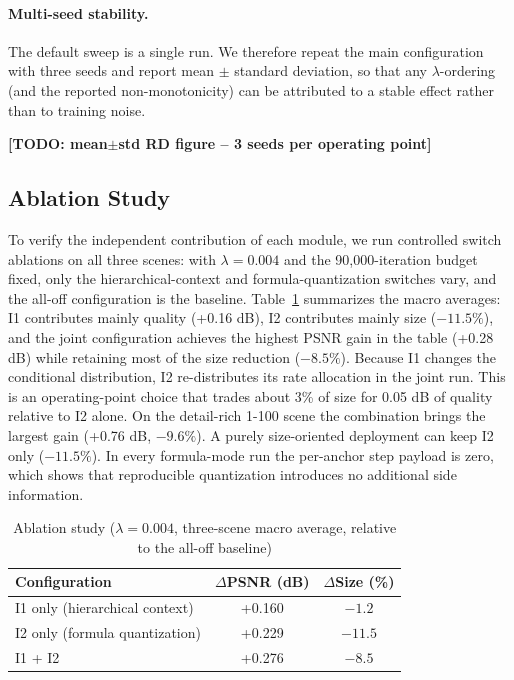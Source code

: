 \documentclass[conference]{IEEEtran}
\begin{document}
\paragraph{Multi-seed stability.}
The default sweep is a single run. We therefore repeat the main
configuration with three seeds and report mean $\pm$ standard deviation,
so that any $\lambda$-ordering (and the reported non-monotonicity) can be
attributed to a stable effect rather than to training noise.
\begin{center}\textbf{[TODO: mean$\pm$std RD figure -- 3 seeds per operating point]}
\end{center}

\subsection{Ablation Study}
\label{sec:ablation}
To verify the independent contribution of each module, we run controlled
switch ablations on all three scenes: with $\lambda=0.004$ and the
90,000-iteration budget fixed, only the hierarchical-context and
formula-quantization switches vary, and the all-off configuration is the
baseline. Table~\ref{tab:ablation} summarizes the macro averages: I1
contributes mainly quality (+0.16 dB), I2 contributes mainly size
($-11.5\%$), and the joint configuration achieves the highest PSNR gain
in the table (+0.28 dB) while retaining most of the size reduction
($-8.5\%$). Because I1 changes the conditional distribution, I2
re-distributes its rate allocation in the joint run. This is an
operating-point choice that trades about 3\% of size for 0.05 dB of
quality relative to I2 alone. On the detail-rich 1-100 scene the
combination brings the largest gain (+0.76 dB, $-9.6\%$). A purely
size-oriented deployment can keep I2 only ($-11.5\%$). In every
formula-mode run the per-anchor step payload is zero, which shows that
reproducible quantization introduces no additional side information.

\begin{table}[t]
\caption{Ablation study (\(\lambda=0.004\), three-scene macro average,
relative to the all-off baseline)}
\centering
\begin{tabular}{@{}l cc@{}}
\toprule
\textbf{Configuration} & \(\Delta\)\textbf{PSNR (dB)} &
\(\Delta\)\textbf{Size (\%)} \\
\midrule
I1 only (hierarchical context) & +0.160 & $-1.2$ \\
I2 only (formula quantization) & +0.229 & $-11.5$ \\
I1 + I2 & +0.276 & $-8.5$ \\
\bottomrule
\end{tabular}
\label{tab:ablation}
\end{table}
\end{document}
